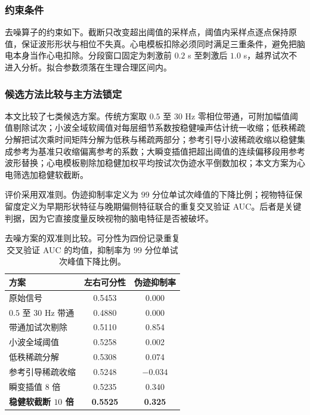 \documentclass[bwprint]{gmcmthesis}
\begin{document}
\subsubsection{约束条件}

去噪算子的约束如下。截断只改变超出阈值的采样点，阈值内采样点逐点保持原值，保证波形形状与相位不失真。心电模板扣除必须同时满足三重条件，避免把脑电本身当作心电扣除。分段窗口固定为刺激前 $0.2$ s 至刺激后 $1.0$ s，越界试次不进入分析。拟合参数须落在生理合理区间内。

\subsubsection{候选方法比较与主方法锁定}

本文比较了七类候选方案。传统方案取 $0.5$ 至 $30$ Hz 零相位带通，可附加幅值阈值剔除试次；小波全域软阈值对每层细节系数按稳健噪声估计统一收缩；低秩稀疏分解把试次乘时间矩阵分解为低秩与稀疏两部分；参考引导小波稀疏收缩以稳健集成参考为基准只收缩偏离参考的系数；大瞬变插值把超出阈值的连续偏移段用参考波形替换；心电模板剔除加稳健加权平均按试次伪迹水平倒数加权；本文方案为心电筛选加稳健软截断。

评价采用双准则。伪迹抑制率定义为 $99$ 分位单试次峰值的下降比例；视物特征保留度定义为早期形状特征与晚期偏侧特征联合的重复交叉验证 AUC。后者是关键判据，因为它直接度量反映视物的脑电特征是否被破坏。

\begin{table}[htp!]
\centering
\renewcommand\arraystretch{1.2}
\caption{去噪方案的双准则比较。可分性为四份记录重复交叉验证 AUC 的均值，抑制率为 $99$ 分位单试次峰值下降比例。}
\begin{tabular}{|l|c|c|}
  \hline
  方案 & 左右可分性 & 伪迹抑制率 \\
  \hline
  原始信号 & 0.5453 & 0.000 \\
  \hline
  $0.5$ 至 $30$ Hz 带通 & 0.4880 & 0.000 \\
  \hline
  带通加试次剔除 & 0.5110 & 0.854 \\
  \hline
  小波全域阈值 & 0.5258 & 0.002 \\
  \hline
  低秩稀疏分解 & 0.5308 & 0.074 \\
  \hline
  参考引导稀疏收缩 & 0.5248 & $-0.034$ \\
  \hline
  瞬变插值 $8$ 倍 & 0.5235 & 0.340 \\
  \hline
  \textbf{稳健软截断 $10$ 倍} & \textbf{0.5525} & \textbf{0.325} \\
  \hline
\end{tabular}
\end{table}
\end{document}
